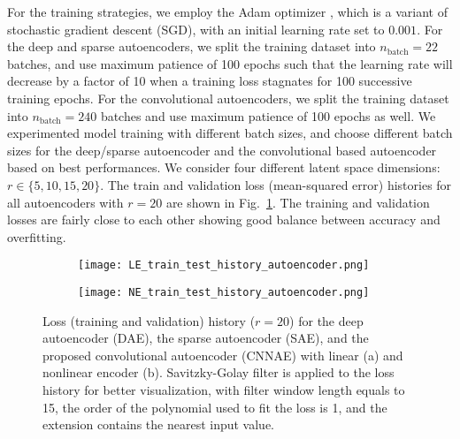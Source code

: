 For the training strategies, we employ the Adam optimizer \cite{kingma2014adam}, which is a variant of stochastic gradient descent (SGD), with an initial learning rate set to $0.001$. For the deep and sparse autoencoders, we split the training dataset into $n_{\text{batch}} = 22$ batches, and use maximum patience of 100 epochs such that the learning rate will decrease by a factor of 10 when a training loss stagnates for 100 successive training epochs. For the convolutional autoencoders, we split the training dataset into $n_{\text{batch}} = 240$ batches and use maximum patience of 100 epochs as well. We experimented model training with different batch sizes, and choose different batch sizes for the deep/sparse autoencoder and the convolutional based autoencoder based on best performances. We consider four different latent space dimensions: $r \in \{ 5, 10, 15, 20 \}$. The train and validation loss (mean-squared error) histories for all autoencoders with $r = 20$ are shown in Fig.~\ref{fig: train test history}. The training and validation losses are fairly close to each other showing good balance between accuracy and overfitting.
\begin{figure}[!htb]
     \begin{center}
        \begin{subfigure}[b]{0.49\textwidth}
            \begin{center}
                \texttt{[image: LE\_train\_test\_history\_autoencoder.png]}
            \end{center}
            \caption{}
        \end{subfigure}
        \begin{subfigure}[b]{0.49\textwidth}
           \begin{center}
            \texttt{[image: NE\_train\_test\_history\_autoencoder.png]}
           \end{center}
            \caption{}
        \end{subfigure}
     \end{center}
        \caption[Loss history ($r = 20$) for the autoencoders.]{Loss (training and validation) history ($r = 20$) for the deep autoencoder (DAE), the sparse autoencoder (SAE), and the proposed convolutional autoencoder (CNNAE) with linear (a) and nonlinear encoder (b). Savitzky-Golay filter is applied to the loss history for better visualization, with filter window length equals to 15, the order of the polynomial used to fit the loss is 1, and the extension contains the nearest input value.}
        \label{fig: train test history}
\end{figure}

